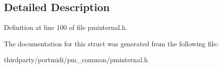 \subsection{Detailed Description}


Definition at line 100 of file pminternal.\+h.



The documentation for this struct was generated from the following file\+:\begin{DoxyCompactItemize}
\item 
thirdparty/portmidi/pm\+\_\+common/pminternal.\+h\end{DoxyCompactItemize}
